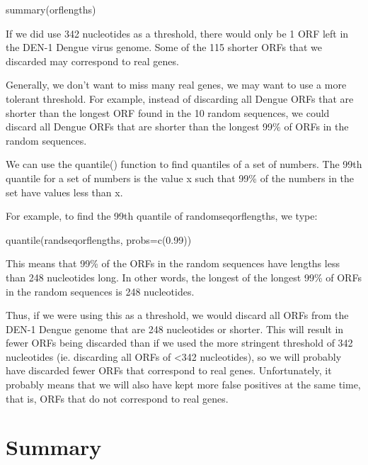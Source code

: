 \documentclass[
]{book}
\newenvironment{Shaded}{\begin{snugshade}}{\end{snugshade}}
\newcommand{\AttributeTok}[1]{\textcolor[rgb]{0.77,0.63,0.00}{#1}}
\newcommand{\FloatTok}[1]{\textcolor[rgb]{0.00,0.00,0.81}{#1}}
\newcommand{\FunctionTok}[1]{\textcolor[rgb]{0.00,0.00,0.00}{#1}}
\newcommand{\NormalTok}[1]{#1}
\begin{document}
\begin{Shaded}
\begin{Highlighting}[]
\FunctionTok{summary}\NormalTok{(orflengths)}
\end{Highlighting}
\end{Shaded}

If we did use 342 nucleotides as a threshold, there would only be 1 ORF left in the DEN-1 Dengue virus genome. Some of the 115 shorter ORFs that we discarded may correspond to real genes.

Generally, we don't want to miss many real genes, we may want to use a more tolerant threshold. For example, instead of discarding all Dengue ORFs that are shorter than the longest ORF found in the 10 random sequences, we could discard all Dengue ORFs that are shorter than the longest 99\% of ORFs in the random sequences.

We can use the quantile() function to find quantiles of a set of numbers. The 99th quantile for a set of numbers is the value x such that 99\% of the numbers in the set have values less than x.

For example, to find the 99th quantile of randomseqorflengths, we type:

\begin{Shaded}
\begin{Highlighting}[]
\FunctionTok{quantile}\NormalTok{(randseqorflengths, }\AttributeTok{probs=}\FunctionTok{c}\NormalTok{(}\FloatTok{0.99}\NormalTok{))}
\end{Highlighting}
\end{Shaded}

This means that 99\% of the ORFs in the random sequences have lengths less than 248 nucleotides long. In other words, the longest of the longest 99\% of ORFs in the random sequences is 248 nucleotides.

Thus, if we were using this as a threshold, we would discard all ORFs from the DEN-1 Dengue genome that are 248 nucleotides or shorter. This will result in fewer ORFs being discarded than if we used the more stringent threshold of 342 nucleotides (ie. discarding all ORFs of \textless342 nucleotides), so we will probably have discarded fewer ORFs that correspond to real genes. Unfortunately, it probably means that we will also have kept more false positives at the same time, that is, ORFs that do not correspond to real genes.

\hypertarget{summary-5}{%
\section{Summary}\label{summary-5}}
\end{document}
